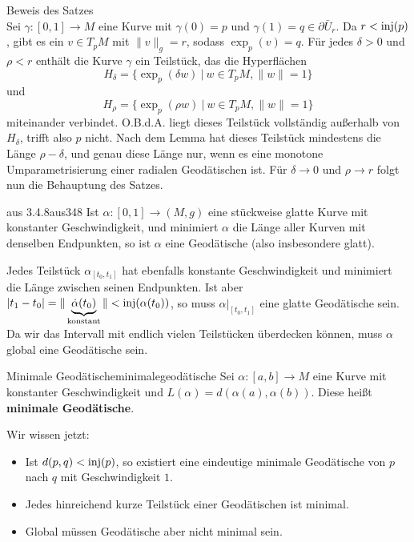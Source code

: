 \begin{beweis} Beweis des Satzes\\
Sei $\gamma: [0,1] \to M$ eine Kurve mit $\gamma(0) = p$ und $\gamma (1) = q \in \partial \bar{U}_r$. Da $r < \text{inj}(p)$, gibt es ein $v \in T_pM$ mit $\|v\|_g = r$, sodass $\exp_p(v)=q$. Für jedes $\delta > 0$ und $\rho < r$ enthält die Kurve $\gamma$ ein Teilstück, das die Hyperflächen
\begin{equation}
H_\delta = \{ \exp_p (\delta w) \ | \ w \in T_pM, \|w\| = 1 \}
\end{equation}
und 
\begin{equation}
H_\rho = \{ \exp_p (\rho w) \ | \ w \in T_pM, \|w\| = 1 \}
\end{equation}
miteinander verbindet. O.B.d.A. liegt dieses Teilstück vollständig außerhalb von $H_\delta$, trifft also $p$ nicht. Nach dem Lemma hat dieses Teilstück mindestens die Länge $\rho - \delta$, und genau diese Länge nur, wenn es eine monotone Umparametrisierung einer radialen Geodätischen ist. Für $\delta \to 0$ und $\rho \to r$ folgt nun die Behauptung des Satzes.
\end{beweis}
\begin{korollar}{aus 3.4.8}{aus348}
Ist $\alpha: [0,1] \to (M,g)$ eine stückweise glatte Kurve mit konstanter Geschwindigkeit, und minimiert $\alpha$ die Länge aller Kurven mit denselben Endpunkten, so ist $\alpha$ eine Geodätische (also insbesondere glatt).
\end{korollar}
\begin{beweis}
Jedes Teilstück $\alpha_{[t_0, t_1]}$ hat ebenfalls konstante Geschwindigkeit und minimiert die Länge zwischen seinen Endpunkten. Ist aber $|t_1-t_0| = \| \underbrace{ \dot{\alpha} (t_0)}_\text{konstant} \| < \text{inj} (\alpha (t_0))$, so muss $\alpha|_{[t_0,t_1]}$ eine glatte Geodätische sein. Da wir das Intervall mit endlich vielen Teilstücken überdecken können, muss $\alpha$ global eine Geodätische sein.
\end{beweis}
\begin{definition}{Minimale Geodätische}{minimalegeodätische}
Sei $\alpha:[a,b] \to M$ eine Kurve mit konstanter Geschwindigkeit und $L(\alpha) = d(\alpha(a), \alpha(b))$. Diese heißt \textbf{minimale Geodätische}.
\end{definition}
Wir wissen jetzt:
\begin{itemize}
	\item Ist $d(p,q) < \text{inj} (p)$, so existiert eine eindeutige minimale Geodätische von $p$ nach $q$ mit Geschwindigkeit $1$.
	\item Jedes hinreichend kurze Teilstück einer Geodätischen ist minimal.
	\item Global müssen Geodätische aber nicht minimal sein.
\end{itemize}
